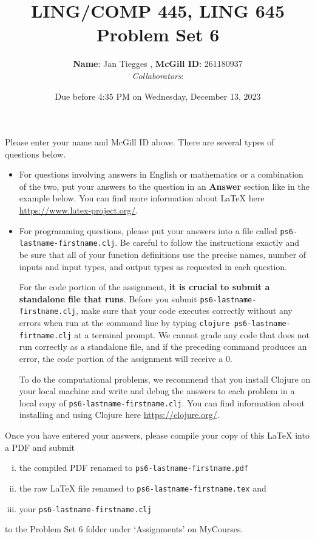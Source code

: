 \documentclass[10pt]{article}
\author{
  \textbf{Name}: Jan Tiegges       %
, \textbf{McGill ID}: 261180937 %
\\ \textit{Collaborators}:  %
}
\newcommand{\PSnum}{6}
\begin{document}
\title{LING/COMP 445, LING 645\\Problem Set \PSnum}
\date{Due before 4:35 PM on Wednesday, December 13, 2023}
\maketitle
Please enter your name and McGill ID above.
There are several types of questions below. 
\begin{itemize}
\item
For questions involving answers in English or mathematics or a
combination of the two, put your answers to the question in an
\textbf{Answer} section like in the example below. You can find more
information about \LaTeX{} here \url{https://www.latex-project.org/}.

\item For programming questions,
please put your answers into a file called
\texttt{ps\PSnum-lastname-firstname.clj}. Be careful to follow the instructions
exactly and be sure that all of your function definitions use the
precise names, number of inputs and input types, and output types as
requested in each question.

For the code portion of the assignment, \textbf{it is crucial to submit a
standalone file that runs}. Before you submit \texttt{ps\PSnum-lastname-firstname.clj}, 
make sure that your code executes correctly without any errors 
when run at the command line by typing 
\texttt{clojure ps\PSnum-lastname-firtname.clj} at a terminal
prompt. We cannot grade any code that does not run correctly as a
standalone file, and if the preceding command produces an error,
the code portion of the assignment will receive a $0$.

To do the computational problems, we recommend that you install
Clojure on your local machine and write and debug the answers to each
problem in a local copy of \texttt{ps\PSnum-lastname-firstname.clj}. You can
find information about installing and using Clojure here
\url{https://clojure.org/}.
\end{itemize}
Once you have entered your answers, please compile your copy of this
\LaTeX{} into a PDF and submit 
\begin{enumerate}[(i),noitemsep]
\item
the compiled PDF renamed to
\texttt{ps\PSnum-lastname-firstname.pdf} 
\item
the raw \LaTeX{} file renamed to
\texttt{ps\PSnum-lastname-firstname.tex} and 
\item
your \texttt{ps\PSnum-lastname-firstname.clj}
\end{enumerate}
to the Problem Set \PSnum{} folder under `Assignments' on MyCourses.
\end{document}
